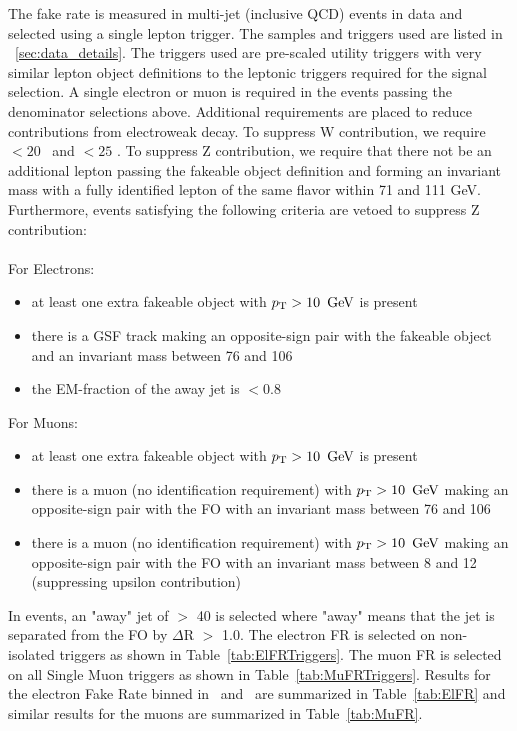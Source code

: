 The fake rate is measured in multi-jet (inclusive QCD) events in data and selected using a single lepton trigger. The samples and triggers used are listed in ~\ref{sec:data_details}. The triggers used are pre-scaled utility triggers with very similar lepton object definitions to the leptonic triggers required for the signal selection. A single electron or muon is required in the events passing the denominator selections above. Additional requirements are placed to reduce contributions from electroweak decay. To suppress W contribution, we require  \MET  $\lt 20$ \GeV \ and \Mt $\lt 25$ \GeV. To suppress Z contribution, we require that there not be an additional lepton passing the fakeable object definition and forming an invariant mass with a fully identified lepton of the same flavor within 71 and 111 GeV. Furthermore, events satisfying the following criteria are vetoed to suppress Z contribution:\\\\
For Electrons:
\begin{itemize}
\item at least one extra fakeable object with $p_{\mathrm{T}} > 10 \ \,\text{Ge\hspace{-.08em}V}$ is present
\item there is a GSF track making an opposite-sign pair with the fakeable object and an invariant mass between 76 and 106 \GeV
\item the EM-fraction of the away jet is $\lt 0.8$
\end{itemize}
For Muons:
\begin{itemize} 
\item at least one extra fakeable object with $p_{\mathrm{T}} > 10 \ \,\text{Ge\hspace{-.08em}V}$ is present
\item there is a muon (no identification requirement) with $p_{\mathrm{T}} > 10 \ \,\text{Ge\hspace{-.08em}V}$ making an opposite-sign pair with 	the FO with an invariant mass between 76 and 106 \GeV
\item there is a muon (no identification requirement) with $p_{\mathrm{T}} > 10 \ \,\text{Ge\hspace{-.08em}V}$ making an opposite-sign pair with the FO with an invariant mass between 8 and 12 \GeV (suppressing upsilon contribution)
\end{itemize}

In events, an "away" jet of \pt $\gt$ 40 \GeV is selected where "away" means that the jet is separated from the FO by $\Delta$R $\gt$ 1.0. The electron FR is selected on non-isolated triggers as shown in Table~\ref{tab:ElFRTriggers}. The muon FR is selected on all Single Muon triggers as shown in Table~\ref{tab:MuFRTriggers}. Results for the electron Fake Rate binned in \pt \ and \aeta \ are summarized in Table~\ref{tab:ElFR} and similar results for the muons are summarized in Table~\ref{tab:MuFR}.\\


